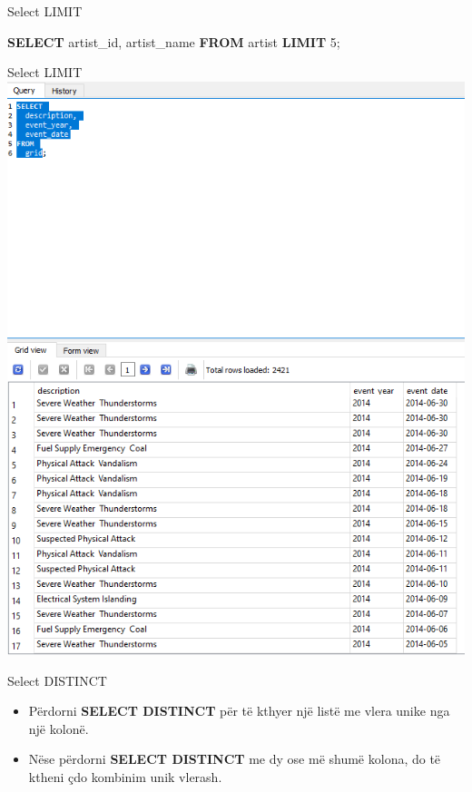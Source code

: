 \documentclass[
  ignorenonframetext,
]{beamer}
\newenvironment{Shaded}{\begin{snugshade}}{\end{snugshade}}
\newcommand{\DecValTok}[1]{\textcolor[rgb]{0.00,0.00,0.81}{#1}}
\newcommand{\KeywordTok}[1]{\textcolor[rgb]{0.13,0.29,0.53}{\textbf{#1}}}
\newcommand{\NormalTok}[1]{#1}
\begin{document}
\begin{frame}[fragile]{Select LIMIT}
\label{select-limit-1}

\begin{Shaded}
\begin{Highlighting}[]
\KeywordTok{SELECT} 
\NormalTok{artist\_id, }
\NormalTok{artist\_name }
\KeywordTok{FROM} 
\NormalTok{artist }
\KeywordTok{LIMIT} \DecValTok{5}\NormalTok{;}
\end{Highlighting}
\end{Shaded}
\end{frame}

\begin{frame}{Select LIMIT}
\label{select-limit-2}
\includegraphics{./Figs/sql16.png}
\end{frame}

\begin{frame}{Select DISTINCT}
\label{select-distinct}
\begin{itemize}
\item
  Përdorni \textbf{SELECT DISTINCT} për të kthyer një listë me vlera
  unike nga një kolonë.
\item
  Nëse përdorni \textbf{SELECT DISTINCT} me dy ose më shumë kolona, do
  të ktheni çdo kombinim unik vlerash.
\end{itemize}
\end{frame}
\end{document}
